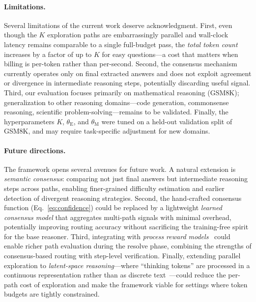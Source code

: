 \paragraph{Limitations.}
Several limitations of the current work deserve acknowledgment.
First, even though the $K$ exploration paths are embarrassingly parallel and wall-clock latency remains comparable to a single full-budget pass, the \emph{total token count} increases by a factor of up to $K$ for easy questions---a cost that matters when billing is per-token rather than per-second.
Second, the consensus mechanism currently operates only on final extracted answers and does not exploit agreement or divergence in intermediate reasoning steps, potentially discarding useful signal.
Third, our evaluation focuses primarily on mathematical reasoning (GSM8K); generalization to other reasoning domains---code generation, commonsense reasoning, scientific problem-solving---remains to be validated.
Finally, the hyperparameters $K$, $\theta_{\mathrm{E}}$, and $\theta_{\mathrm{M}}$ were tuned on a held-out validation split of GSM8K, and may require task-specific adjustment for new domains.

\paragraph{Future directions.}
The \method{} framework opens several avenues for future work.
A natural extension is \emph{semantic consensus}: comparing not just final answers but intermediate reasoning steps across paths, enabling finer-grained difficulty estimation and earlier detection of divergent reasoning strategies.
Second, the hand-crafted consensus function (Eq.~\ref{eq:confidence}) could be replaced by a lightweight \emph{learned consensus model} that aggregates multi-path signals with minimal overhead, potentially improving routing accuracy without sacrificing the training-free spirit for the base reasoner.
Third, integrating \method{} with \emph{process reward models}~\citep{lightman2024lets} could enable richer path evaluation during the resolve phase, combining the strengths of consensus-based routing with step-level verification.
Finally, extending parallel exploration to \emph{latent-space reasoning}---where ``thinking tokens'' are processed in a continuous representation rather than as discrete text~\citep{hao2024training}---could reduce the per-path cost of exploration and make the framework viable for settings where token budgets are tightly constrained.
